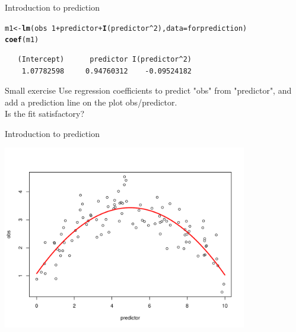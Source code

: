 \documentclass[10pt]{beamer}\usepackage[]{graphicx}\usepackage[]{color}
\makeatletter
\newcommand{\hlnum}[1]{\textcolor[rgb]{0.686,0.059,0.569}{#1}}%
\newcommand{\hlopt}[1]{\textcolor[rgb]{0,0,0}{#1}}%
\newcommand{\hlstd}[1]{\textcolor[rgb]{0.345,0.345,0.345}{#1}}%
\newcommand{\hlkwb}[1]{\textcolor[rgb]{0.69,0.353,0.396}{#1}}%
\newcommand{\hlkwc}[1]{\textcolor[rgb]{0.333,0.667,0.333}{#1}}%
\newcommand{\hlkwd}[1]{\textcolor[rgb]{0.737,0.353,0.396}{\textbf{#1}}}%
\newenvironment{kframe}{%
 \def\at@end@of@kframe{}%
 \ifinner\ifhmode%
  \def\at@end@of@kframe{\end{minipage}}%
  \begin{minipage}{\columnwidth}%
 \fi\fi%
 \def\FrameCommand##1{\hskip\@totalleftmargin \hskip-\fboxsep
 \colorbox{shadecolor}{##1}\hskip-\fboxsep
     \hskip-\linewidth \hskip-\@totalleftmargin \hskip\columnwidth}%
 \MakeFramed {\advance\hsize-\width
   \@totalleftmargin\z@ \linewidth\hsize
   \@setminipage}}%
 {\par\unskip\endMakeFramed%
 \at@end@of@kframe}
\newenvironment{knitrout}{}{} %
\makeatother
\begin{document}
\begin{frame}[fragile]{Introduction to prediction}

\begin{knitrout}
\color{fgcolor}\begin{kframe}
\begin{alltt}
\hlstd{m1} \hlkwb{<-} \hlkwd{lm}\hlstd{(obs} \hlopt{~} \hlnum{1} \hlopt{+} \hlstd{predictor} \hlopt{+} \hlkwd{I}\hlstd{(predictor}\hlopt{^}\hlnum{2}\hlstd{),} \hlkwc{data}\hlstd{=forprediction)}
\hlkwd{coef}\hlstd{(m1)}
\end{alltt}
\begin{verbatim}
   (Intercept)      predictor I(predictor^2) 
    1.07782598     0.94760312    -0.09524182 
\end{verbatim}
\end{kframe}
\end{knitrout}
  
  \begin{alertblock}{Small exercise}
    Use regression coefficients to predict "obs" from "predictor", and add a prediction line on the plot obs/predictor.\\
    Is the fit satisfactory?
  \end{alertblock}
\end{frame}

\begin{frame}[fragile]{Introduction to prediction}


  
\begin{knitrout}
\color{fgcolor}
\includegraphics[width=0.8\textwidth,height=0.6\textwidth]{figure/unnamed-chunk-14-1} 

\end{knitrout}
\end{frame}
\end{document}
